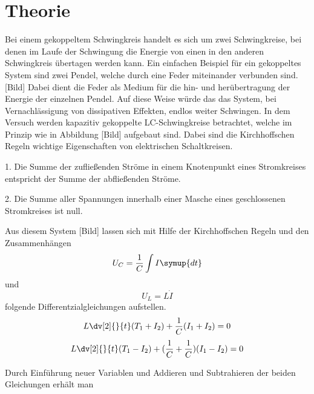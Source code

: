 \section{Theorie}
\label{sec:Theorie}

Bei einem gekoppeltem Schwingkreis handelt es sich um zwei Schwingkreise, bei denen im Laufe der Schwingung
die Energie von einen in den anderen Schwingkreis übertagen werden kann. Ein einfachen Beispiel für ein gekoppeltes
System sind zwei Pendel, welche durch eine Feder miteinander verbunden sind. [Bild] Dabei dient die Feder als Medium für die hin- und herübertragung der Energie der einzelnen Pendel.
Auf diese Weise würde das das System, bei Vernachlässigung von dissipativen Effekten, endlos weiter Schwingen.
In dem Versuch werden kapazitiv gekoppelte LC-Schwingkreise betrachtet, welche im Prinzip wie in Abbildung [Bild]
aufgebaut sind. Dabei sind die Kirchhoffschen Regeln wichtige Eigenschaften von elektrischen Schaltkreisen. 

1.  Die Summe der zufließenden Ströme in einem Knotenpunkt eines Stromkreises entspricht
    der Summe der abfließenden Ströme.

2.  Die Summe aller Spannungen innerhalb einer Masche eines geschlossenen Stromkreises
    ist null.

Aus diesem System [Bild] lassen sich mit Hilfe der Kirchhoffschen Regeln und den Zusammenhängen
\begin{equation*}
    U_C=\frac{1}{C}\int I \symup{dt}
\end{equation*}
und
\begin{equation*}
    U_L=L\dot{I}
\end{equation*}
folgende Differentzialgleichungen aufstellen.
\begin{equation}
    L\dv[2]{}{t}(T_1+I_2)+\frac{1}{C}(I_1+I_2)=0
\end{equation}
\begin{equation}
    L\dv[2]{}{t}(T_1-I_2)+(\frac{1}{C}+\frac{1}{C})(I_1-I_2)=0
\end{equation}

Durch Einführung neuer Variablen und Addieren und Subtrahieren der beiden Gleichungen erhält man





